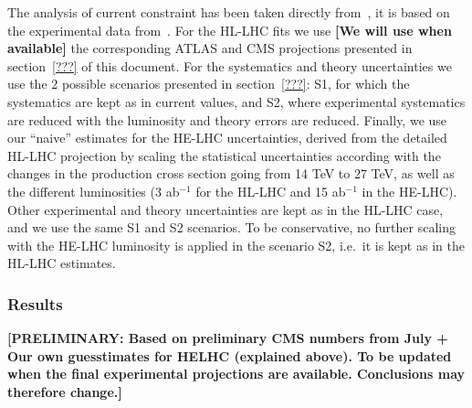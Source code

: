 The analysis of current constraint has been taken directly from~\cite{deBlas:2018tjm}, it is based on the experimental data from~\cite{Aaltonen:2013ipa,Abazov:2013gmz,Chatrchyan:2013iaa,Chatrchyan:2013vaa,Chatrchyan:2013zna,Aad:2014eha,Aad:2014eva,Aad:2014xzb,ATLAS:2014aga,Chatrchyan:2014nva,Khachatryan:2014ira,Khachatryan:2014jba,Khachatryan:2014qaa,Aad:2015gba,Aad:2015gra,Aad:2015ona,Aad:2015vsa,ATLAS:2016gld,CMS:2016mmc,Khachatryan:2016vau,Aaboud:2017jvq,Aaboud:2017ojs,Aaboud:2017rss,Aaboud:2017uhw,Aaboud:2017vzb,Aaboud:2017xsd,CMS:2017rli,CMS-PAS-HIG-17-007,CMS-PAS-HIG-17-019,Sirunyan:2017elk,Sirunyan:2017exp,Sirunyan:2017khh,Aaboud:2018xdt,ATLAS-CONF-2018-004,Sirunyan:2018egh,Sirunyan:2018mvw,Sirunyan:2018shy,Sirunyan:2018ygk}. 
For the HL-LHC fits we use {\bf [We will use when available]} the corresponding ATLAS and CMS projections presented in section~\ref{???} of this document.  For the systematics and theory uncertainties we use the 2 possible scenarios presented in section~\ref{???}: S1, for which the systematics are kept as in current values, and S2, where experimental systematics are reduced with the luminosity and theory errors are reduced.
%
Finally, we use our ``naive'' estimates for the HE-LHC uncertainties, derived from the
detailed HL-LHC projection by scaling the statistical uncertainties according with the changes in the production cross section going from 14 TeV to 27 TeV, as well as the different luminosities (3 ab$^{-1}$ for the HL-LHC and 15 ab$^{-1}$ in the HE-LHC).
Other experimental and theory uncertainties are kept as in the HL-LHC case, and we use the same S1 and S2 scenarios. To be conservative, no further scaling with the HE-LHC luminosity is applied in the scenario S2, i.e.~it is kept as in the HL-LHC estimates. 
\subsubsection{Results}\label{sec:2:results}
{\bf [PRELIMINARY: Based on preliminary CMS numbers from July + Our own guesstimates for HELHC (explained above). 
To be updated when the final experimental projections are available. Conclusions may therefore change.]}\\

